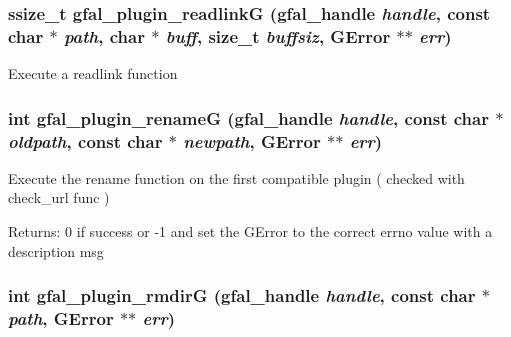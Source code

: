 \subsubsection{\setlength{\rightskip}{0pt plus 5cm}ssize\_\-t gfal\_\-plugin\_\-readlink\-G (gfal\_\-handle {\em handle}, const char $\ast$ {\em path}, char $\ast$ {\em buff}, size\_\-t {\em buffsiz}, GError $\ast$$\ast$ {\em err})}\label{gfal__common__plugin_8c_d2e6e573b52926185793ff4f0dd5e307}


Execute a readlink function 
\subsubsection{\setlength{\rightskip}{0pt plus 5cm}int gfal\_\-plugin\_\-rename\-G (gfal\_\-handle {\em handle}, const char $\ast$ {\em oldpath}, const char $\ast$ {\em newpath}, GError $\ast$$\ast$ {\em err})}\label{gfal__common__plugin_8c_ee26850796f50439ded98dafc7cd064b}


Execute the rename function on the first compatible plugin ( checked with check\_\-url func ) \begin{Desc}
\item[Returns:]0 if success or -1 and set the GError to the correct errno value with a description msg \end{Desc}
\subsubsection{\setlength{\rightskip}{0pt plus 5cm}int gfal\_\-plugin\_\-rmdir\-G (gfal\_\-handle {\em handle}, const char $\ast$ {\em path}, GError $\ast$$\ast$ {\em err})}\label{gfal__common__plugin_8c_d3bcfafdf8d90935cb312388cdd6bb92}


